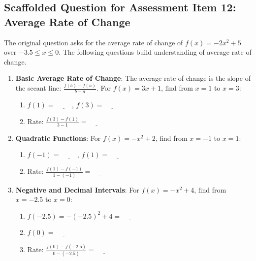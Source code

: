 \documentclass[12pt]{article}
\begin{document}
\subsection*{Scaffolded Question for Assessment Item 12: Average Rate of Change}
The original question asks for the average rate of change of \( f(x) = -2x^2 + 5 \) over \( -3.5 \leq x \leq 0 \). The following questions build understanding of average rate of change.

\begin{enumerate}[label=12.\arabic*]
    \item \textbf{Basic Average Rate of Change}: The average rate of change is the slope of the secant line: \( \frac{f(b) - f(a)}{b - a} \). For \( f(x) = 3x + 1 \), find from \( x = 1 \) to \( x = 3 \):
    \begin{enumerate}[label=\alph*)]
        \item \( f(1) = \underline{\hspace{1cm}} \), \( f(3) = \underline{\hspace{1cm}} \)
        \item Rate: \( \frac{f(3) - f(1)}{3 - 1} = \underline{\hspace{1cm}} \)
    \end{enumerate}
    \item \textbf{Quadratic Functions}: For \( f(x) = -x^2 + 2 \), find from \( x = -1 \) to \( x = 1 \):
    \begin{enumerate}[label=\alph*)]
        \item \( f(-1) = \underline{\hspace{1cm}} \), \( f(1) = \underline{\hspace{1cm}} \)
        \item Rate: \( \frac{f(1) - f(-1)}{1 - (-1)} = \underline{\hspace{1cm}} \)
    \end{enumerate}
    \item \textbf{Negative and Decimal Intervals}: For \( f(x) = -x^2 + 4 \), find from \( x = -2.5 \) to \( x = 0 \):
    \begin{enumerate}[label=\alph*)]
        \item \( f(-2.5) = -(-2.5)^2 + 4 = \underline{\hspace{1cm}} \)
        \item \( f(0) = \underline{\hspace{1cm}} \)
        \item Rate: \( \frac{f(0) - f(-2.5)}{0 - (-2.5)} = \underline{\hspace{1cm}} \)

\end{enumerate}
\end{enumerate}
\end{document}
